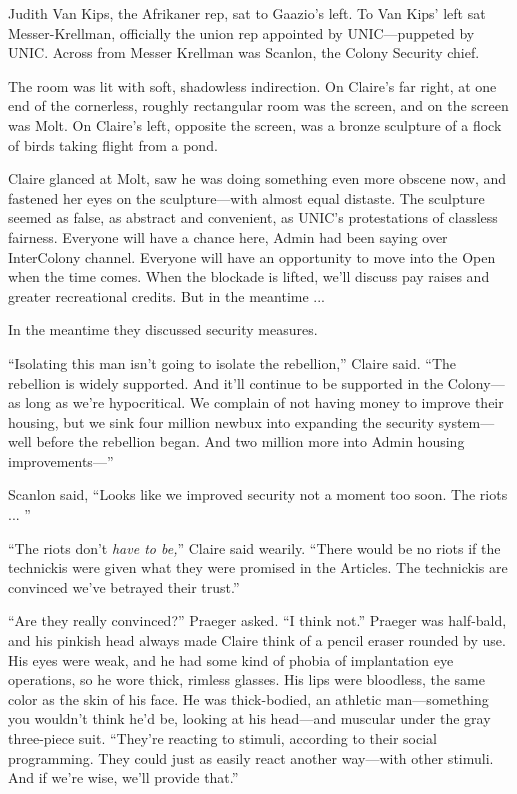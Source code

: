 Judith Van Kips, the Afrikaner rep, sat to Gaazio's left. To Van Kips' left sat Messer-Krellman, officially the union rep appointed by UNIC---puppeted by UNIC. Across from Messer Krellman was Scanlon, the Colony Security chief.

The room was lit with soft, shadowless indirection. On Claire's far right, at one end of the cornerless, roughly rectangular room was the screen, and on the screen was Molt. On Claire's left, opposite the screen, was a bronze sculpture of a flock of birds taking flight from a pond.

Claire glanced at Molt, saw he was doing something even more obscene now, and fastened her eyes on the sculpture---with almost equal distaste. The sculpture seemed as false, as abstract and convenient, as UNIC's protestations of classless fairness. Everyone will have a chance here, Admin had been saying over InterColony channel. Everyone will have an opportunity to move into the Open when the time comes. When the blockade is lifted, we'll discuss pay raises and greater recreational credits. But in the meantime ...

In the meantime they discussed security measures.

``Isolating this man isn't going to isolate the rebellion,'' Claire said. ``The rebellion is widely supported. And it'll continue to be supported in the Colony---as long as we're hypocritical. We complain of not having money to improve their housing, but we sink four million newbux into expanding the security system---well before the rebellion began. And two million more into Admin housing improvements---''

Scanlon said, ``Looks like we improved security not a moment too soon. The riots ... ''

``The riots don't \textit{have to be,}'' Claire said wearily. ``There would be no riots if the technickis were given what they were promised in the Articles. The technickis are convinced we've betrayed their trust.''

``Are they really convinced?'' Praeger asked. ``I think not.'' Praeger was half-bald, and his pinkish head always made Claire think of a pencil eraser rounded by use. His eyes were weak, and he had some kind of phobia of implantation eye operations, so he wore thick, rimless glasses. His lips were bloodless, the same color as the skin of his face. He was thick-bodied, an athletic man---something you wouldn't think he'd be, looking at his head---and muscular under the gray three-piece suit. ``They're reacting to stimuli, according to their social programming. They could just as easily react another way---with other stimuli. And if we're wise, we'll provide that.''

